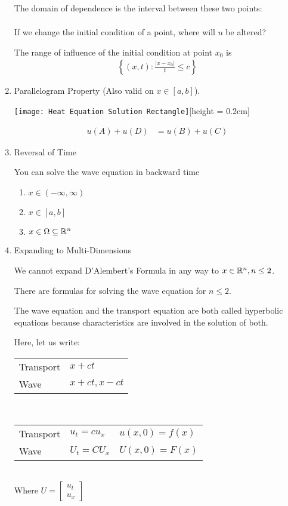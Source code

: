 \begin{enumerate}
  The domain of dependence is the interval between these two points:
  \begin{align}
    [x_0 - ct_0, x_0 + ct_0]
  \end{align}

  If we change the initial condition of a point, where will $u$ be altered?

  The range of influence of the initial condition at point $x_0$ is
  \begin{align}
    \left\{ (x, t) : \frac{| x - x_0|}{t} \leq c \right\}
  \end{align}
  \item Parallelogram Property (Also valid on $x \in [a, b]$).
  \begin{center}
    \texttt{[image: Heat Equation Solution Rectangle]}[height = 0.2cm]
  \end{center}
  \begin{align}
    u(A) + u(D) & = u(B) + u(C)
  \end{align}

  \item Reversal of Time

  You can solve the wave equation in backward time
  \begin{enumerate}
    \item $x \in (-\infty, \infty)$
    \item $x \in [a, b]$
    \item $x \in \Omega \subseteq \mathbb R^n$
  \end{enumerate}

  \item Expanding to Multi-Dimensions

  We cannot expand D'Alembert's Formula in any way to $x \in \mathbb R^n, n \leq 2$.

  There are formulas for solving the wave equation for $n \leq 2$.

  The wave equation and the transport equation are both called hyperbolic equations because characteristics are involved in the solution of both.

  Here, let us write:
  \begin{center}
    \begin{tabular}{l|l}
      Transport & $x + ct$\\
      Wave & $x + ct, x - ct$
    \end{tabular}\\
    \smallbreak
    \begin{tabular}{l|ll}
      Transport & $u_t = cu_x$ & $u(x, 0) = f(x)$\\
      Wave & $U_t = CU_x$ & $U(x, 0) = F(x)$
    \end{tabular}\\
    Where $U =
    \begin{bmatrix}
      u_t\\
      u_x
    \end{bmatrix}
    $
  \end{center}


\end{enumerate}
